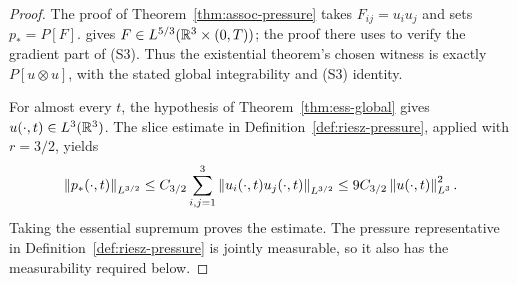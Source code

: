 \documentclass[11pt,letterpaper]{article}
\numberwithin{equation}{section}
\theoremstyle{plain}
\theoremstyle{definition}
\theoremstyle{remark}
\begin{document}
\begin{proof}
The proof of Theorem~\ref{thm:assoc-pressure} takes
$F_{ij}=u_i u_j$ and sets $p_*=P[F]$. \cite[Lemma~8.4]{CKNLean}
gives $F\in L^{5/3}(\mathbb{R}^3\times(0,T))$; the proof there uses
\cite[Lemma~8.2]{CKNLean} to verify the gradient part of (S3). Thus the
existential theorem's chosen witness is exactly $P[u\otimes u]$, with the
stated global integrability and (S3) identity.

For almost every $t$, the hypothesis of Theorem~\ref{thm:ess-global} gives
$u(\cdot,t)\in L^3(\mathbb{R}^3)$. The slice estimate in
Definition~\ref{def:riesz-pressure}, applied with $r=3/2$, yields
\[
 \left\lVert p_*(\cdot,t)\right\rVert_{L^{3/2}}
 \le C_{3/2}\sum_{i,j=1}^3
                    \left\lVert u_i(\cdot,t)u_j(\cdot,t)\right\rVert_{L^{3/2}}
 \le 9C_{3/2}\left\lVert u(\cdot,t)\right\rVert_{L^3}^2.
\]
Taking the essential supremum proves the estimate. The pressure representative
in Definition~\ref{def:riesz-pressure} is jointly measurable, so it also has
the measurability required below.
\end{proof}
\end{document}
